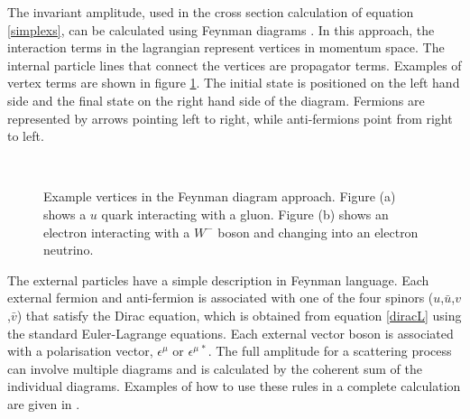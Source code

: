 The invariant amplitude, used in the cross section calculation of equation \ref{simplexs}, can be calculated using Feynman diagrams \cite{Halzen:1984mc}. In this approach, the interaction terms in the lagrangian represent vertices in momentum space. The internal particle lines that connect the vertices are propagator terms. Examples of vertex terms are shown in figure \ref{feynmannvertices}. The initial state is positioned on the left hand side and the final state on the right hand side of the diagram.  Fermions are represented by arrows pointing left to right, while anti-fermions point from right to left. 

\begin{figure} 
\centering
\mbox{
	\qquad
	}
\caption[Example vertices in the Feynman diagram approach]{Example vertices in the Feynman diagram approach. Figure (a) shows a $u$ quark interacting with a gluon. Figure (b) shows an electron interacting with a $W^{-}$ boson and changing into an electron neutrino.\label{feynmannvertices}}
\end{figure}

The external particles have a simple description in Feynman language. Each external fermion and anti-fermion is associated with one of the four spinors ($u$,$\bar{u}$,$v$,$\bar{v}$) that satisfy the Dirac equation, which is obtained from equation \ref{diracL} using the standard Euler-Lagrange equations. Each external vector boson is associated with a polarisation vector, $\epsilon^{\mu}$ or $\epsilon^{\mu \, *}$. The full amplitude for a scattering process can involve multiple diagrams and is calculated by the coherent sum of the individual diagrams. Examples of how to use these rules in a complete calculation are given in \cite{Halzen:1984mc,Mandl:1985bg}.
					


